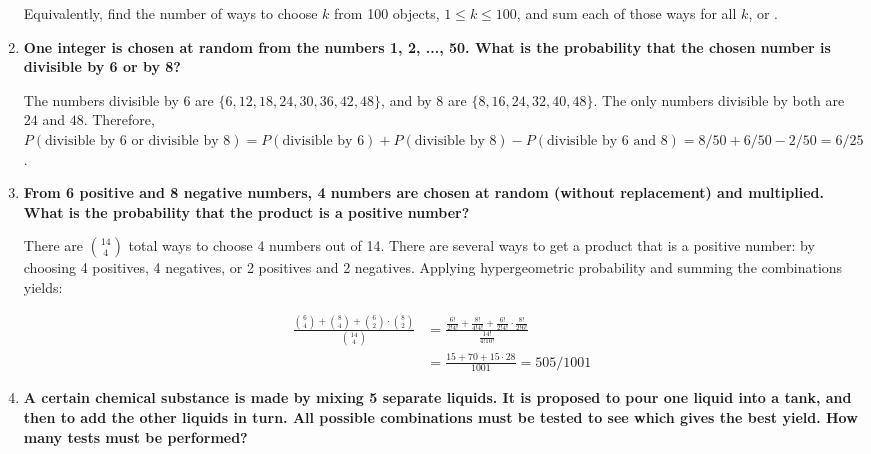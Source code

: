 \documentclass[10pt, oneside]{article}   	%
\theoremstyle{definition}
\begin{document}
\begin{enumerate}[label=2.\arabic*]
  Equivalently, find the number of ways to choose $k$ from 100 objects, $1 \leq k \leq 100$, and sum each of those ways for all $k$, or .
\item \begin{tcolorbox}[
  colback=Cerulean!5!white,
  colframe=Cerulean!75!black]
  \textbf{One integer is chosen at random from the numbers 1, 2, ..., 50. What is the probability that the chosen number is divisible by 6 or by 8?}
  \end{tcolorbox}
  
  The numbers divisible by 6 are $\{ 6, 12, 18, 24, 30, 36, 42, 48 \}$, and by 8 are $\{ 8, 16, 24, 32, 40, 48 \}$. The only numbers divisible by both are $24$ and $48$. Therefore, $P(\text{divisible by 6 or divisible by 8}) = P(\text{divisible by 6}) + P(\text{divisible by 8}) - P(\text{divisible by 6 and 8}) = 8/50 + 6/50 - 2/50 = \boxed{6/25}$.
\item \begin{tcolorbox}[
  colback=Cerulean!5!white,
  colframe=Cerulean!75!black]
  \textbf{From 6 positive and 8 negative numbers, 4 numbers are chosen at random (without replacement) and multiplied. What is the probability that the product is a positive number?}
  \end{tcolorbox}
  
  There are $\binom{14}{4}$ total ways to choose 4 numbers out of 14. There are several ways to get a product that is a positive number: by choosing 4 positives, 4 negatives, or 2 positives and 2 negatives. Applying hypergeometric probability and summing the combinations yields:
  
  \begin{align*}
  \frac{\binom{6}{4} + \binom{8}{4} + \binom{6}{2} \cdot \binom{8}{2} }{\binom{14}{4}} &= \frac{ \frac{6!}{2! 4!} + \frac{8!}{4! 4!} + \frac{6!}{2! 4!} \cdot \frac{8!}{2! 6!} }{\frac{14!}{4! 10!}} \\
  &= \frac{15 + 70 + 15\cdot 28}{1001} = \boxed{505/1001}
  \end{align*}
\item \begin{tcolorbox}[
  colback=Cerulean!5!white,
  colframe=Cerulean!75!black]
  \textbf{A certain chemical substance is made by mixing 5 separate liquids. It is proposed to pour one liquid into a tank, and then to add the other liquids in turn. All possible combinations must be tested to see which gives the best yield. How many tests must be performed?}
  \end{tcolorbox}
  

\end{enumerate}
\end{document}
